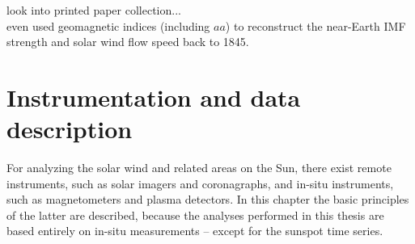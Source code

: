 look into printed paper collection...\\

\citet{Lockwood2014} even used geomagnetic indices (including $aa$) to reconstruct the near-Earth IMF strength and solar wind flow speed back to 1845.\\





\chapter{Instrumentation and data description}
\label{chap:data}
For analyzing the solar wind and related areas on the Sun, there exist remote instruments, such as solar imagers and coronagraphs, and in-situ instruments, such as magnetometers and plasma detectors. In this chapter the basic principles of the latter are described, because the analyses performed in this thesis are based entirely on in-situ measurements -- except for the sunspot time series.

